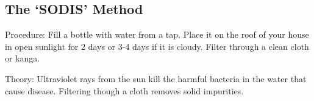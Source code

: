 \begin{multicols}{2}
\subsection{The `SODIS' Method} %


\begin{description*}
\item[Procedure:]{Fill a bottle with water from a tap. Place it on the roof of your house in open sunlight for 2 days or 3-4 days if it is cloudy. Filter through a clean cloth or kanga.}
\item[Theory:]{Ultraviolet rays from the sun kill the harmful bacteria in the water that cause disease. Filtering though a cloth removes solid impurities.}
\end{description*}



\end{multicols}

\pagebreak